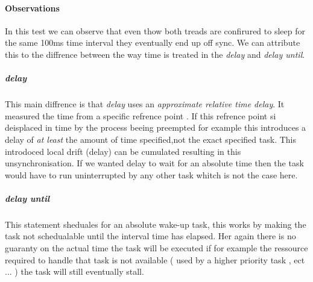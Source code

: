 \documentclass[10pt,a4paper]{article}
\begin{document}
\paragraph{Observations}
In this test we can observe that even thow both treads are confirured to sleep for the same 100ms time interval they eventually end up off sync. We can attribute this to the diffrence between the way time is treated in the \emph{delay} and \emph{delay until}.
\\
\subparagraph{delay}
This main diffrence is that \emph{delay} uses an \textit{approximate relative time delay}. It measured the time from a specific refrence point . If this refrence point si deisplaced in time by the process beeing preempted for example this  introduces a delay of \emph{at least} the amount of time specified,not the exact specified task. This introdoced local drift (delay) can be cumulated resulting in this unsynchronisation.
If we wanted delay to wait for an absolute time then the task would have to run uninterrupted by any other task whitch is not the case here.
\subparagraph{delay until}
This statement sheduales for an absolute wake-up task, this works by making the task not schedualable until the interval time has elapsed. Her again there is no guaranty on the actual time the task will be executed if for example the ressource required to handle that task is not available ( used by a higher priority task , ect ... ) the task will still eventually stall. 
\end{document}
